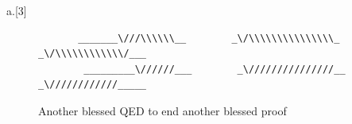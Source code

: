\begin{question}{a.}[3]
\begin{Questions}
\begin{figure}[H]
\begin{verbatim}
       _______\///\\\\\\__        _\/\\\\\\\\\\\\\\\_        _\/\\\\\\\\\\\\/___ 
        _________\//////___        _\///////////////__        _\////////////_____
\end{verbatim}
\caption{Another blessed QED to end another blessed proof}
\end{figure}
  \vfill
  \vfill\eject
  \clearpage
  
  \end{Questions}
  \end{question}
